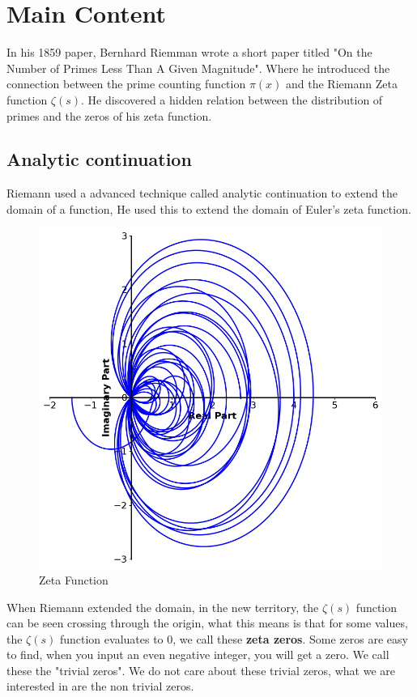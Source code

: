 \documentclass[12pt]{amsart} %
\theoremstyle{definition}
\theoremstyle{remark}
\numberwithin{equation}{section}
\begin{document}

\section{Main Content}
In his 1859 paper, Bernhard Riemman wrote a short paper titled "On the Number of Primes Less Than A Given Magnitude". Where he introduced the connection between the prime counting function $\pi(x) $ and the Riemann Zeta function $\zeta(s)$. He discovered a hidden relation between the distribution of primes and the zeros of his zeta function.
 


\subsection{Analytic continuation}
Riemann used a advanced technique called analytic continuation to extend the domain of a function, He used this to extend the domain of Euler's zeta function.

\begin{figure}[h!]
    \centering
    \includegraphics[width=0.8\linewidth]{../Images/zetafunction}
    \caption{Zeta Function}
    \label{fig:euler_zeta}
\end{figure}
When Riemann extended the domain, in the new territory, the $\zeta(s)$ function can be seen crossing through the origin, what this means is that for some values, the $\zeta(s)$ function evaluates to 0, we call these \textbf{zeta zeros}. Some zeros are easy to find, when you input an even negative integer, you will get a zero. We call these the "trivial zeros". We do not care about these trivial zeros, what we are interested in are the non trivial zeros.
\end{document}
